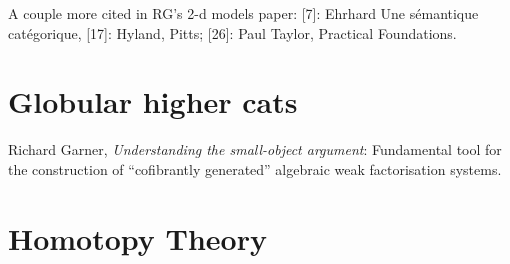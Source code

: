 \documentclass{article}
\begin{document}
A couple more cited in RG's 2-d models paper: [7]: Ehrhard Une sémantique catégorique, [17]: Hyland, Pitts; [26]: Paul Taylor, Practical Foundations.

\section{Globular higher cats}

\cite{garner:understanding} Richard Garner, \emph{Understanding the small-object argument}:  Fundamental tool for the construction of ``cofibrantly generated'' algebraic weak factorisation systems.


\section{Homotopy Theory}



\end{document}

